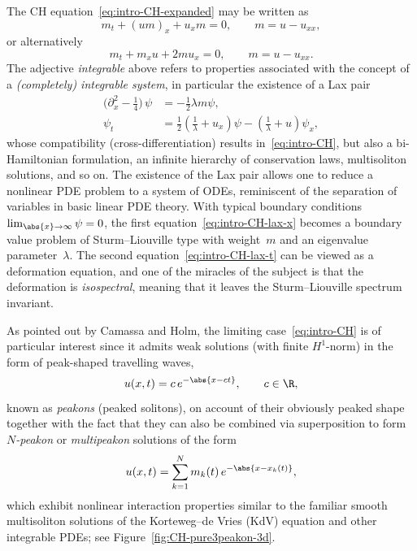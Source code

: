 \documentclass[10pt,a4paper]{article} \pdfoutput=1 
\begin{document}
The CH equation~\eqref{eq:intro-CH-expanded} may be written as
\begin{equation}
  \label{eq:intro-CH}
  m_t + (um)_x + u_x m = 0
  ,\qquad
  m = u - u_{xx}
  ,
\end{equation}
or alternatively
\begin{equation}
  \label{eq:intro-CH-b-form}
  m_t + m_x u + 2 m u_x = 0
  ,\qquad
  m = u - u_{xx}
  .
\end{equation}
The adjective \emph{integrable} above refers to
properties associated with the concept of a
\emph{(completely) integrable system},
in particular the existence of a Lax pair
\begin{subequations}
  \label{eq:intro-CH-lax}
  \begin{align}
    \label{eq:intro-CH-lax-x}
    \bigl( \partial_x^2 - \tfrac14 \bigr) \, \psi &= -\tfrac12 \lambda m \psi
    , \\
    \label{eq:intro-CH-lax-t}
    \psi_t &= \tfrac12  \left( \tfrac{1}{\lambda} + u_x \right) \psi - \left( \tfrac{1}{\lambda} + u \right) \psi_x
    ,
  \end{align}
\end{subequations}
whose compatibility (cross-differentiation) results in~\eqref{eq:intro-CH},
but also a bi-Hamiltonian formulation,
an infinite hierarchy of conservation laws,
multisoliton solutions, and so on.
The existence of the Lax pair allows one to reduce a nonlinear PDE
problem to a system of ODEs, reminiscent of the separation of
variables in basic linear PDE theory. With typical boundary
conditions $\lim_{\abs{x} \to \infty} \psi=0$, the first equation~\eqref{eq:intro-CH-lax-x}
becomes a boundary value problem of Sturm--Liouville type with weight~$m$
and an eigenvalue parameter~$\lambda$. The second equation~\eqref{eq:intro-CH-lax-t}
can be viewed as a deformation equation, and one of the miracles of the
subject is that the deformation is \emph{isospectral}, meaning that it
leaves the Sturm--Liouville spectrum invariant.

As pointed out by Camassa and Holm,
the limiting case~\eqref{eq:intro-CH} is of particular interest since it
admits weak solutions (with finite $H^1$-norm) in the form of peak-shaped travelling waves,
\begin{equation}
  \label{eq:intro-single-peakon}
  u(x,t) = c \, e^{-\abs{x - ct}}
  ,\qquad
  c \in \R
  ,
\end{equation}
known as \emph{peakons} (peaked solitons),
on account of their obviously peaked shape together with the fact
that they can also be combined via superposition to form
\emph{$N$-peakon} or \emph{multipeakon} solutions
of the form
\begin{equation}
  \label{eq:intro-peakons}
  u(x,t) = \sum_{k=1}^N m_k(t) \, e^{-\abs{x - x_k(t)}}
  ,
\end{equation}
which exhibit nonlinear interaction properties
similar to the familiar smooth
multisoliton solutions of the Korteweg--de Vries (KdV) equation
and other integrable PDEs; see Figure~\ref{fig:CH-pure3peakon-3d}.
\end{document}
